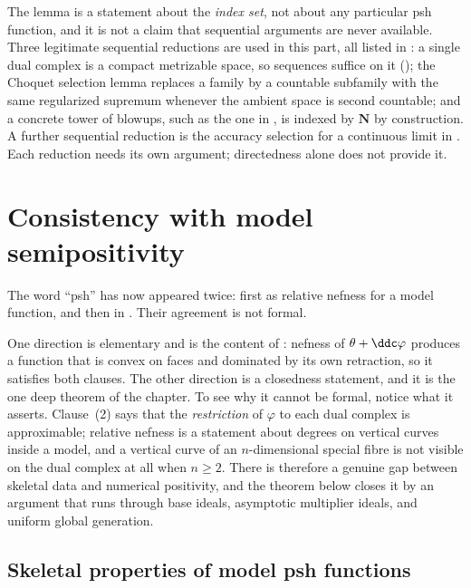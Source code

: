 \begin{remark}
\label{rem:ch21-nets-scope}
The lemma is a statement about the \emph{index set}, not about any
particular psh function, and it is not a claim that sequential arguments are
never available.  Three legitimate sequential reductions are used in this
part, all listed in : a single dual
complex is a compact metrizable space, so sequences suffice on it
(); the Choquet selection lemma
 replaces a family by a countable subfamily with
the same regularized supremum whenever the ambient space is second
countable; and a concrete tower of blowups, such as the one in
, is indexed by $\mathbf N$ by construction.
A further sequential reduction is the accuracy selection for a
continuous limit in .  Each reduction needs
its own argument; directedness alone does not provide it.
\end{remark}

\section{Consistency with model semipositivity}
\label{sec:ch21-consistency}

The word ``psh'' has now appeared twice: first as relative nefness for a
model function, and then in .  Their agreement is not
formal.

One direction is elementary and is the content of
: nefness of
$\theta+\ddc\varphi$ produces a function that is convex on faces and dominated by its own
retraction, so it satisfies both clauses.  The other direction is a
closedness statement, and it is the one deep theorem of the chapter.  To see
why it cannot be formal, notice what it asserts.  Clause~(2) says that the
\emph{restriction} of $\varphi$ to each dual complex is approximable;
relative nefness is a statement about degrees on vertical curves inside a
model, and a vertical curve of an $n$-dimensional special fibre is not
visible on the dual complex at all when $n\geq2$.  There is therefore a
genuine gap between skeletal data and numerical positivity, and the theorem
below closes it by an argument that runs through base ideals, asymptotic
multiplier ideals, and uniform global generation.

\subsection{Skeletal properties of model psh functions}
\label{sec:ch21-model-skeletal}

